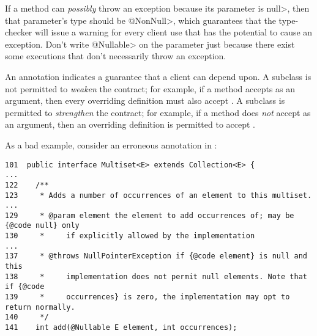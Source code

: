 
If a method can \emph{possibly} throw an exception because its parameter
is \<null>, then that parameter's type should be \<@NonNull>, which
guarantees that the type-checker will issue a warning for every client
use that has the potential to cause an exception.  Don't write
\<@Nullable> on the parameter just because there exist some executions that
don't necessarily throw an exception.




An annotation indicates a guarantee that a client can depend upon.  A subclass
is not permitted to \emph{weaken} the contract; for example,
if a method accepts  as an argument, then every overriding
definition must also accept .
A subclass is permitted to \emph{strengthen} the contract; for example,
if a method does \emph{not} accept  as an argument, then an
overriding definition is permitted to accept .

\begin{sloppypar}
As a bad example, consider an erroneous  annotation in
\href{https://github.com/google/guava/blob/master/guava/src/com/google/common/collect/Multiset.java\#L129}{}:
\end{sloppypar}

\begin{Verbatim}
101  public interface Multiset<E> extends Collection<E> {
...
122    /**
123     * Adds a number of occurrences of an element to this multiset.
...
129     * @param element the element to add occurrences of; may be {@code null} only
130     *     if explicitly allowed by the implementation
...
137     * @throws NullPointerException if {@code element} is null and this
138     *     implementation does not permit null elements. Note that if {@code
139     *     occurrences} is zero, the implementation may opt to return normally.
140     */
141    int add(@Nullable E element, int occurrences);
\end{Verbatim}

